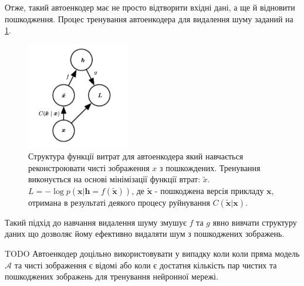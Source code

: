 \documentclass[14pt,a4paper]{extarticle}
\newcounter{e}
\numberwithin{equation}{section}
\numberwithin{figure}{section}
\begin{document}
	Отже, такий автоенкодер має не просто відтворити вхідні дані, а ще й відновити пошкодження. Процес тренування автоенкодера для видалення шуму заданий на \ref{fig:dae-graph}.
	\begin{figure}[h]
		\centering
		\includegraphics[width=0.4\textwidth]{resources/dae-graph.png}
		\caption{
			Структура функції витрат для автоенкодера який навчається реконстроювати чисті зображення $x$ з пошкождених. Тренування виконується на основі мінімізації функції втрат: $\tilde{x}$.  $L = - \log p (\boldsymbol {x} | \boldsymbol {h} = f (\tilde {\boldsymbol {x}}))$, де $\tilde {\boldsymbol {x}}$ - пошкоджена версія прикладу $\boldsymbol {x}$, отримана в результаті деякого процесу руйнування $C (\tilde {\boldsymbol {x}} | \boldsymbol {x})$. \cite{Goodfellow-et-al-2016}
		}
		\label{fig:dae-graph}
	\end{figure}
		
	Такий підхід до навчання видалення шуму змушує $f$ та $g$ явно вивчати структуру даних що дозволяє йому ефективно видаляти шум з пошкоджених зображень.




	TODO
	Автоенкодер доцільно використовувати у випадку коли коли пряма модель $\mathcal{A}$ та чисті зображення є відомі або коли є достатня кількість пар чистих та пошкоджених зображень для тренування нейронної мережі. 


\end{document}
